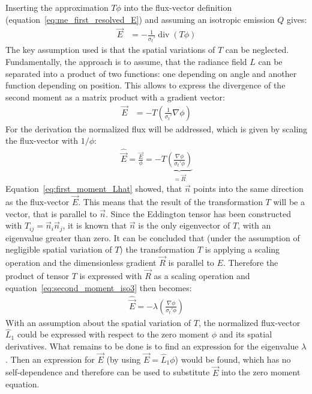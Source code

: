 Inserting the approximation $T\phi$ into the flux-vector definition (equation~\ref{eq:me_first_resolved_E}) and assuming an isotropic emission $Q$ gives:
\begin{align*}
\vec{E}&= -\frac{1}{\sigma_t'}\operatorname{div}\left (T\phi\right )
\end{align*}
The key assumption used is that the spatial variations of $T$ can be neglected. Fundamentally, the approach is to assume, that the radiance field $L$ can be separated into a product of two functions: one depending on angle and another function depending on position. This allows to express the divergence of the second moment as a matrix product with a gradient vector:
\begin{align}
\vec{E}&= -T\left(\frac{1}{\sigma_t'}\nabla\phi\right )
\label{eq:second_moment_iso2}
\end{align}
For the derivation the normalized flux will be addressed, which is given by scaling the flux-vector with $1/\phi$:
\begin{align}
\widehat{\vec{E}} = \frac{\vec{E}}{\phi}= -T\underbrace{\left(\frac{\nabla\phi}{\sigma_t'\phi}\right )}_{=\vec{R}}
\label{eq:second_moment_iso3}
\end{align}
Equation~\ref{eq:first_moment_Lhat} showed, that $\vec{n}$ points into the same direction as the flux-vector $\vec{E}$. This means that the result of the transformation $T$ will be a vector, that is parallel to $\vec{n}$. Since the Eddington tensor has been constructed with $T_{ij}=\vec{n}_i\vec{n}_j$, it is known that $\vec{n}$ is the only eigenvector of $T$, with an eigenvalue greater than zero. It can be concluded that (under the assumption of negligible spatial variation of $T$) the transformation $T$ is applying a scaling operation and the dimensionless gradient $\vec{R}$ is parallel to $E$. Therefore the product of tensor $T$ is expressed with $\vec{R}$ as a scaling operation and equation~\ref{eq:second_moment_iso3} then becomes:
\begin{align}
\widehat{\vec{E}} = -\lambda\left(\frac{\nabla\phi}{\sigma_t'\phi}\right )
\label{eq:second_moment_iso4}
\end{align}
With an assumption about the spatial variation of $T$, the normalized flux-vector $\hat{L}_1$ could be expressed with respect to the zero moment $\phi$ and its spatial derivatives. What remains to be done is to find an expression for the eigenvalue $\lambda$. Then an expression for $\vec{E}$ (by using $\vec{E}=\hat{L}_1\phi$) would be found, which has no self-dependence and therefore can be used to substitute $\vec{E}$ into the zero moment equation.

